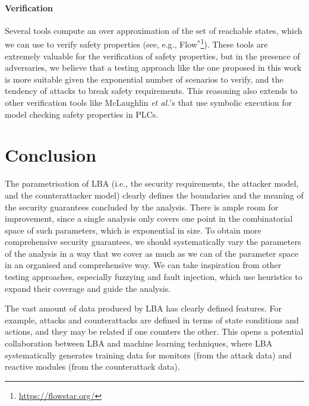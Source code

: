 {\paragraph{Verification}
Several tools compute an over approximation of the set of reachable states, which we can use to verify safety properties (see, e.g., Flow$^*$\footnote{\url{https://flowstar.org/}}). 
These tools are extremely valuable for the verification of safety properties, but in the presence of adversaries, we believe that a testing approach like the one proposed in this work is more suitable given the exponential number of scenarios to verify, and the tendency of attacks to break safety requirements. This reasoning also extends to other verification tools like McLaughlin \emph{et al.}'s \cite{TSVPLC} that use symbolic execution for model checking safety properties in PLCs.

{
}
\section{Conclusion}
\label{sec:CPSRobustness:Conclusion} 
The parametrisation of LBA (i.e., the security requirements, the attacker model, and the counterattacker model) clearly defines the boundaries and the meaning of the security guarantees concluded by the analysis. There is ample room for improvement, since a single analysis only covers one point in the combinatorial space of such parameters, which is exponential in size. To obtain more comprehensive security guarantees, we should systematically vary the parameters of the analysis in a way that we cover as much as we can of the parameter space in an organised and comprehensive way. We can take inspiration from other testing approaches, especially fuzzying and fault injection, which use heuristics to expand their coverage and guide the analysis. 

The vast amount of data produced by LBA has clearly defined features. For example, attacks and counterattacks are defined in terms of state conditions and actions, and they may be related if one counters the other. This opens a potential collaboration between LBA and machine learning techniques, where LBA systematically generates training data for monitors (from the attack data) and reactive modules (from the counterattack data).

}
